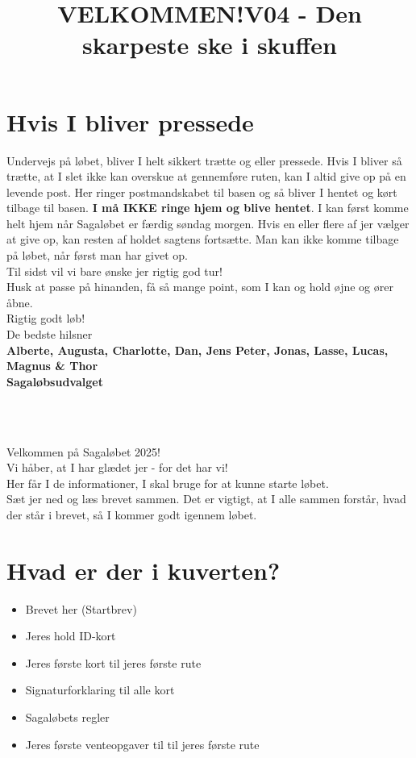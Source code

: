 \section{Hvis I bliver pressede}
Undervejs på løbet, bliver I helt sikkert trætte og eller pressede. Hvis I bliver så trætte, at I slet ikke kan overskue at gennemføre ruten, kan I altid give op på en levende post. Her ringer postmandskabet til basen og så bliver I hentet og kørt tilbage til basen. \textbf{I må IKKE ringe hjem og blive hentet}. I kan først komme helt hjem når Sagaløbet er færdig søndag morgen. Hvis en eller flere af jer vælger at give op, kan resten af holdet sagtens fortsætte. Man kan ikke komme tilbage på løbet, når først man har givet op.\\
\newline
Til sidst vil vi bare ønske jer rigtig god tur!\\
Husk at passe på hinanden, få så mange point, som I kan og hold øjne og ører åbne.\\
\newline
Rigtig godt løb!\\
\newline
\textcolor{søblå}{De bedste hilsner}\\
\textcolor{natblå}{\textbf{Alberte, Augusta, Charlotte, Dan, Jens Peter, Jonas, Lasse, Lucas, Magnus \& Thor}}\\
\textcolor{natblå}{\textbf{Sagaløbsudvalget}}\\
\newpage
\title{VELKOMMEN!}\\
\newline
\title{\textcolor{søblå}{V04 - Den skarpeste ske i skuffen }}\\
\newline
Velkommen på Sagaløbet 2025!\\
Vi håber, at I har glædet jer - for det har vi!\\
Her får I de informationer, I skal bruge for at kunne starte løbet.\\
Sæt jer ned og læs brevet sammen. Det er vigtigt, at I alle sammen forstår, hvad der står i brevet, så I kommer godt igennem løbet.
\section{Hvad er der i kuverten?}
\begin{itemize}
    \item Brevet her (Startbrev)
    \item Jeres hold ID-kort
    \item Jeres første kort til jeres første rute
    \item Signaturforklaring til alle kort
    \item Sagaløbets regler
    \item Jeres første venteopgaver til til jeres første rute
\end{itemize}
